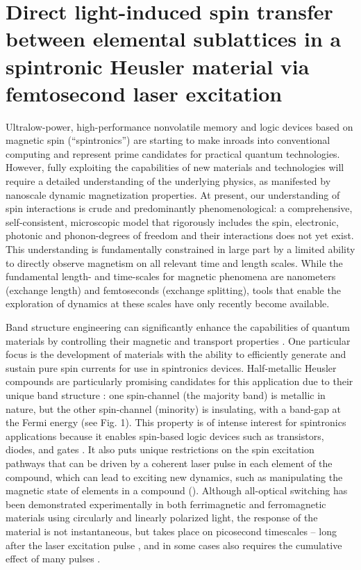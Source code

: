 \chapter{Direct light-induced spin transfer between elemental sublattices in a spintronic Heusler material via femtosecond laser excitation}
\label{heuslerpaper}

Ultralow-power, high-performance nonvolatile memory and logic devices based on magnetic spin (“spintronics”) are starting to make inroads into conventional computing and represent prime candidates for practical quantum technologies. However, fully exploiting the capabilities of new materials and technologies will require a detailed understanding of the underlying physics, as manifested by nanoscale dynamic magnetization properties. At present, our understanding of spin interactions is crude and predominantly phenomenological: a comprehensive, self-consistent, microscopic model that rigorously includes the spin, electronic, photonic and phonon-degrees of freedom and their interactions does not yet exist. This understanding is fundamentally constrained in large part by a limited ability to directly observe magnetism on all relevant time and length scales. While the fundamental length- and time-scales for magnetic phenomena are nanometers (exchange length) and femtoseconds (exchange splitting), tools that enable the exploration of dynamics at these scales have only recently become available. 

Band structure engineering can significantly enhance the capabilities of quantum materials by controlling their magnetic and transport properties \cite{He2017,Klaer2009}. One particular focus is the development of materials with the ability to efficiently generate and sustain pure spin currents for use in spintronics devices. Half-metallic Heusler compounds are particularly promising candidates for this application due to their unique band structure \cite{Muller2009, Mann2012}: one spin-channel (the majority band) is metallic in nature, but the other spin-channel (minority) is insulating, with a band-gap at the Fermi energy (see Fig. 1). This property is of intense interest for spintronics applications because it enables spin-based logic devices such as transistors, diodes, and gates \cite{Prinz1995}. It also puts unique restrictions on the spin excitation pathways that can be driven by a coherent laser pulse in each element of the compound, which can lead to exciting new dynamics, such as manipulating the magnetic state of elements in a compound (\cite{Elliott2016,Steil2010}). Although all-optical switching has been demonstrated experimentally in both ferrimagnetic and ferromagnetic materials using circularly and linearly polarized light, the response of the material is not instantaneous, but takes place on picosecond timescales – long after the laser excitation pulse \cite{Kuiper2014}, and in some cases also requires the cumulative effect of many pulses \cite{Lambert2014,Mangin2014}.

